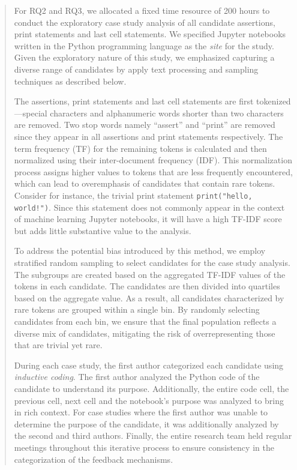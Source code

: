 \documentclass[11pt,fleqn]{article}
\begin{document}
\begin{quote}
  For RQ2 and RQ3, we allocated a fixed time resource of 200 hours to conduct the exploratory case study analysis of all candidate assertions, print statements and last cell statements. We specified Jupyter notebooks written in the Python programming language as the \emph{site} for the study. Given the exploratory nature of this study, we emphasized capturing a diverse range of candidates by apply text processing and sampling techniques as described below.

  The assertions, print statements and last cell statements are first tokenized---special characters and alphanumeric words shorter than two characters are removed. Two stop words namely ``assert'' and ``print'' are removed since they appear in all assertions and print statements respectively. The term frequency (TF) for the remaining tokens is calculated and then normalized using their inter-document frequency (IDF). 
  This normalization process assigns higher values to tokens that are less frequently encountered, which can lead to overemphasis of candidates that contain rare tokens. Consider for instance, the trivial print statement \texttt{print("hello, world!")}. Since this statement does not commonly appear in the context of machine learning Jupyter notebooks, it will have a high TF-IDF score but adds little substantive value to the analysis.

  To address the potential bias introduced by this method, we employ stratified random sampling to select candidates for the case study analysis. The subgroups are created based on the aggregated TF-IDF values of the tokens in each candidate. The candidates are then divided into quartiles based on the aggregate value. As a result, all candidates characterized by rare tokens are grouped within a single bin. By randomly selecting candidates from each bin, we ensure that the final population reflects a diverse mix of candidates, mitigating the risk of overrepresenting those that are trivial yet rare.

  During each case study, the first author categorized each candidate using \emph{inductive coding}. The first author analyzed the Python code of the candidate to understand its purpose. Additionally, the entire code cell, the previous cell, next cell and the notebook's purpose was analyzed to bring in rich context. For case studies where the first author was unable to determine the purpose of the candidate, it was additionally analyzed by the second and third authors. Finally, the entire research team held regular meetings throughout this iterative process to ensure consistency in the categorization of the feedback mechanisms.


\end{quote}
\end{document}
